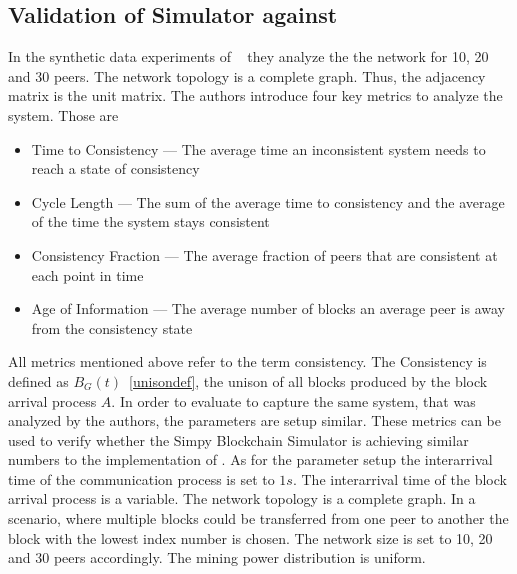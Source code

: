 \subsection{Validation of Simulator against \gopalan}\label{gopalananalysis}
In the synthetic data experiments of \gopalan~  they analyze the the network for 10, 20 and 30 peers. The network topology is a complete graph. Thus, the adjacency matrix is the unit matrix. 
The authors introduce four key metrics to analyze the system. Those are 
\begin{itemize}
\item Time to Consistency --- The average time an inconsistent system needs to reach a state of consistency
\item Cycle Length --- The sum of the average time to consistency and the average of the time the system stays consistent
\item Consistency Fraction --- The average fraction of peers that are consistent at each point in time
\item Age of Information --- The average number of blocks an average peer is away from the consistency state
\end{itemize}
All metrics mentioned above refer to the term consistency. The Consistency is defined as $B_G(t)$~\ref{unisondef}, the unison of all blocks produced by the block arrival process $A$.
In order to evaluate to capture the same system, that was analyzed by the authors, the parameters are setup similar.
These metrics can be used to verify whether the Simpy Blockchain Simulator is achieving similar numbers to the implementation of \gopalan . As for the parameter setup the interarrival time of the communication process is set to $1s$. The interarrival time of the block arrival process is a variable. The network topology is a complete graph. In a scenario, where multiple blocks could be transferred from one peer to another the block with the lowest index number is chosen. The network size is set to 10, 20 and 30 peers accordingly. The mining power distribution is uniform.


